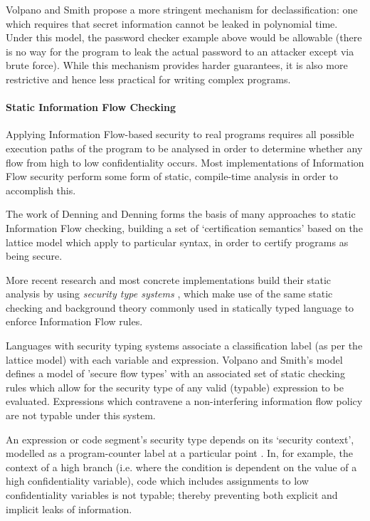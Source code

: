 	Volpano and Smith \cite{volpano2000declassification} propose a more stringent mechanism for declassification: one which requires that secret information cannot be leaked in polynomial time. Under this model, the password checker example above would be allowable (there is no way for the program to leak the actual password to an attacker except via brute force). While this mechanism provides harder guarantees, it is also more restrictive \cite{zdancewic2004challenges} and hence less practical for writing complex programs.
	
	\paragraph{Static Information Flow Checking}
	
	Applying Information Flow-based security to real programs requires all possible execution paths of the program to be analysed in order to determine whether any flow from high to low confidentiality occurs. Most implementations of Information Flow security perform some form of static, compile-time analysis in order to accomplish this.
	
	The work of Denning and Denning \cite{denning1977if} forms the basis of many approaches to static Information Flow checking, building a set of `certification semantics' based on the lattice model which apply to particular syntax, in order to certify programs as being secure.
	
	More recent research and most concrete implementations build their static analysis by using \textit{security type systems} \cite{sabelfeld2003if}, which make use of the same static checking and background theory commonly used in statically typed language to enforce Information Flow rules.
	
	Languages with security typing systems associate a classification label (as per the lattice model) with each variable and expression. Volpano and Smith's model \cite{volpano1996sectype} defines a model of 'secure flow types' with an associated set of static checking rules which allow for the security type of any valid (typable) expression to be evaluated. Expressions which contravene a non-interfering information flow policy are not typable under this system.
	
	An expression or code segment's security type depends on its `security context', modelled as a program-counter label at a particular point \cite{sabelfeld2003if}. In, for example, the context of a high branch (i.e. where the condition is dependent on the value of a high confidentiality variable), code which includes assignments to low confidentiality variables is not typable; thereby preventing both explicit and implicit leaks of information.
	
